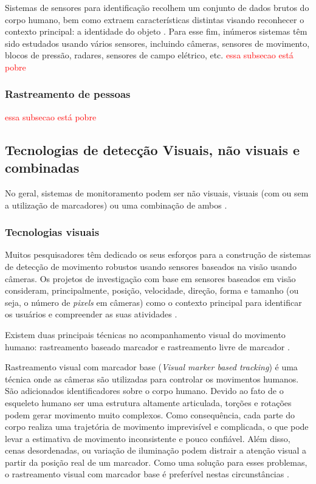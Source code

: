 Sistemas de sensores para identificação recolhem um conjunto de dados brutos do corpo humano, bem como extraem características distintas visando reconhecer o contexto principal: a identidade do objeto \cite{yun2014human}. Para esse fim, inúmeros sistemas têm sido estudados usando vários sensores, incluindo câmeras, sensores de movimento, blocos de pressão, radares, sensores de campo elétrico, etc.
\textcolor{red}{essa subsecao está pobre}
 
\subsubsection{Rastreamento de pessoas}\label{sec:rastre-amb-fec}

 \textcolor{red}{essa subsecao está pobre}

\subsection{Tecnologias de detecção Visuais, não visuais e combinadas}\label{sec:tec-rastreamento}
No geral, sistemas de monitoramento podem ser não visuais, visuais (com ou sem a utilização de marcadores) ou uma combinação de ambos \cite{zhou2008human}.

\subsubsection{Tecnologias visuais}\label{sec:sens-genericos}
Muitos pesquisadores têm dedicado os seus esforços para a construção de sistemas de detecção de movimento robustos usando sensores baseados na visão usando câmeras. Os projetos de investigação com base em sensores baseados em visão consideram, principalmente, posição, velocidade, direção, forma e tamanho (ou seja, o número de \textit{pixels} em câmeras) como o contexto principal para identificar os usuários e compreender as suas atividades \cite{stauffer200l}.

Existem duas principais técnicas no acompanhamento visual do movimento humano: rastreamento baseado marcador e rastreamento livre de marcador \cite{YTao2010}.

Rastreamento visual com marcador base (\textit{Visual marker based tracking}) é uma técnica onde as câmeras são utilizadas para controlar os movimentos humanos. São adicionados identificadores sobre o corpo humano. Devido ao fato de o esqueleto humano ser uma estrutura altamente articulada, torções e rotações podem gerar movimento muito complexos. Como consequência, cada parte do corpo realiza uma trajetória de movimento imprevisível e complicada, o que pode levar a estimativa de movimento inconsistente e pouco confiável. Além disso, cenas desordenadas, ou variação de iluminação podem distrair a atenção visual a partir da posição real de um marcador. Como uma solução para esses problemas, o rastreamento visual com marcador base é preferível nestas circunstâncias \cite{zhang2002visual}.

